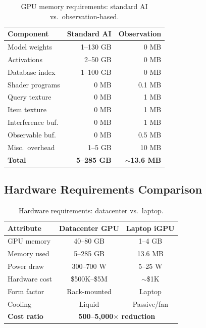 \documentclass[11pt,twocolumn,a4paper]{article}
\theoremstyle{definition}
\theoremstyle{remark}
\begin{document}
\begin{table}[H]
\centering
\caption{GPU memory requirements: standard AI vs.\ observation-based.}
\label{tab:memory}
\begin{tabular}{@{}lrr@{}}
\toprule
\textbf{Component} & \textbf{Standard AI} & \textbf{Observation} \\
\midrule
Model weights & 1--130 GB & 0 MB \\
Activations & 2--50 GB & 0 MB \\
Database index & 1--100 GB & 0 MB \\
Shader programs & 0 MB & 0.1 MB \\
Query texture & 0 MB & 1 MB \\
Item texture & 0 MB & 1 MB \\
Interference buf. & 0 MB & 1 MB \\
Observable buf. & 0 MB & 0.5 MB \\
Misc.\ overhead & 1--5 GB & 10 MB \\
\midrule
\textbf{Total} & \textbf{5--285 GB} & \textbf{$\sim$13.6 MB} \\
\bottomrule
\end{tabular}
\end{table}

\subsection{Hardware Requirements Comparison}

\begin{table}[H]
\centering
\caption{Hardware requirements: datacenter vs.\ laptop.}
\label{tab:hardware}
\begin{tabular}{@{}lcc@{}}
\toprule
\textbf{Attribute} & \textbf{Datacenter GPU} & \textbf{Laptop iGPU} \\
\midrule
GPU memory & 40--80 GB & 1--4 GB \\
Memory used & 5--285 GB & 13.6 MB \\
Power draw & 300--700 W & 5--25 W \\
Hardware cost & \$500K--\$5M & $\sim$\$1K \\
Form factor & Rack-mounted & Laptop \\
Cooling & Liquid & Passive/fan \\
\midrule
\textbf{Cost ratio} & \multicolumn{2}{c}{\textbf{500--5{,}000$\times$ reduction}} \\
\bottomrule
\end{tabular}
\end{table}
\end{document}
